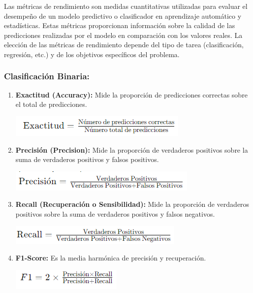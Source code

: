 \documentclass[
]{article}
\begin{document}
Las métricas de rendimiento son medidas cuantitativas utilizadas para
evaluar el desempeño de un modelo predictivo o clasificador en
aprendizaje automático y estadísticas. Estas métricas proporcionan
información sobre la calidad de las predicciones realizadas por el
modelo en comparación con los valores reales. La elección de las
métricas de rendimiento depende del tipo de tarea (clasificación,
regresión, etc.) y de los objetivos específicos del problema.

\hypertarget{clasificaciuxf3n-binaria}{%
\subsubsection{\texorpdfstring{\textbf{Clasificación
Binaria:}}{Clasificación Binaria:}}\label{clasificaciuxf3n-binaria}}

\begin{enumerate}
\def\labelenumi{\arabic{enumi}.}
\item
  \textbf{Exactitud (Accuracy):} Mide la proporción de predicciones
  correctas sobre el total de predicciones.

  \includegraphics{images/EXACTITUD.png}
\item
  \textbf{Precisión (Precision):} Mide la proporción de verdaderos
  positivos sobre la suma de verdaderos positivos y falsos positivos.

  \includegraphics{images/Precision.png}
\item
  \textbf{Recall (Recuperación o Sensibilidad):} Mide la proporción de
  verdaderos positivos sobre la suma de verdaderos positivos y falsos
  negativos.

  \includegraphics{images/Recall.png}
\item
  \textbf{F1-Score:} Es la media harmónica de precisión y recuperación.

  \includegraphics{images/F1.png}
\end{enumerate}
\end{document}
